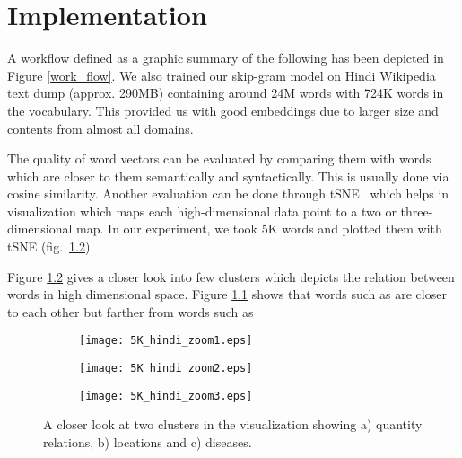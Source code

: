 \chapter{Implementation}
	A workflow defined as a graphic summary of the following has been depicted in Figure \ref{work_flow}.
	We also trained our skip-gram model on Hindi Wikipedia text dump (approx. 290MB) containing around 24M words with 724K words in the vocabulary. This provided us with good embeddings due to larger size and contents from almost all domains.

The quality of word vectors can be evaluated by comparing them with words which are closer to them semantically and syntactically. This is usually done via cosine similarity.  Another evaluation can be done through tSNE~\cite{Maaten:08} which helps in visualization which maps each high-dimensional data point to a two or three-dimensional map. In our experiment, we took 5K words and plotted
them with tSNE (fig.~\ref{fig:5K_hindi_zoom}). 



%

Figure \ref{fig:5K_hindi_zoom} gives a closer look into few clusters which depicts the relation between words in high dimensional space. Figure \ref{fig:5K_hindi_zoom1} shows that words such as 
are closer to each other but farther from words such as 

\begin{figure}[ht!]
    \centering
    \begin{subfigure}{.4\linewidth}
        \texttt{[image: 5K\_hindi\_zoom1.eps]}
        \caption{}
        \label{fig:5K_hindi_zoom1}
    \end{subfigure}
    \newline
    \begin{subfigure}{.4\linewidth}
        \texttt{[image: 5K\_hindi\_zoom2.eps]}
        \caption{}
    \end{subfigure}
    \newline
    \begin{subfigure}{.4\linewidth}
        \texttt{[image: 5K\_hindi\_zoom3.eps]}
        \caption{}
    \end{subfigure}
    \caption{A closer look at two clusters in the visualization showing a) quantity relations, b) locations and c) diseases.}
    \label{fig:5K_hindi_zoom}
\end{figure}

